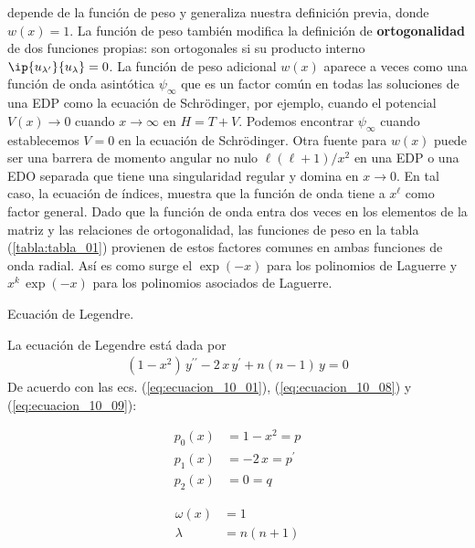 depende de la función de peso y generaliza nuestra definición previa, donde $w(x) = 1$. La función de peso también modifica la definición de \textbf{ortogonalidad} de dos funciones propias: son ortogonales si su producto interno $\ip{u_{\lambda^{\prime}}}{u_{\lambda}} = 0$. La función de peso adicional $w(x)$ aparece a veces como una función de onda asintótica $\psi_{\infty}$ que es un factor común en todas las soluciones de una EDP como la ecuación de Schrödinger, por ejemplo, cuando el potencial $V(x) \to 0$ cuando $x \to \infty$ en $H = T + V$. Podemos encontrar $\psi_{\infty}$ cuando establecemos $V = 0$ en la ecuación de Schrödinger. Otra fuente para $w(x)$ puede ser una barrera de momento angular no nulo $\ell (\ell +1)/x^{2}$ en una EDP o una EDO separada que tiene una singularidad regular y domina en $x \to 0$. En tal caso, la ecuación de índices, muestra que la función de onda tiene a $x^{\ell}$ como factor general. Dado que la función de onda entra dos veces en los elementos de la matriz y las relaciones de ortogonalidad, las funciones de peso en la tabla (\ref{tabla:tabla_01}) provienen de estos factores comunes en ambas funciones de onda radial. Así es como surge el $\exp(-x)$ para los polinomios de Laguerre y $x^{k} \, \exp(-x)$ para los polinomios asociados de Laguerre.
\begin{ejemplo}{Ecuación de Legendre.}

La ecuación de Legendre está dada por
\begin{align}
(1 - x^{2}) \, y^{\prime \prime} - 2 \, x \, y^{\prime} +  n(n -1) \, y = 0
\label{eq:ecuacion_10_09}
\end{align}
De acuerdo con las ecs. (\ref{eq:ecuacion_10_01}), (\ref{eq:ecuacion_10_08}) y (\ref{eq:ecuacion_10_09}):
\begin{center}
\begin{minipage}{4cm}
\begin{align*}
p_{0} (x) &= 1 - x^{2} = p \\
p_{1} (x) &= -2 \, x = p^{\prime} \\
p_{2} (x) &= 0 = q
\end{align*}
\end{minipage}
\hspace{2cm}
\begin{minipage}{4cm}
\begin{align*}
\omega (x) &= 1 \\
\lambda &= n (n + 1)
\end{align*}
\end{minipage}
\end{center}
\end{ejemplo}

